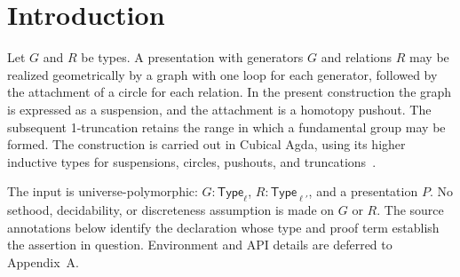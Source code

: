 \section{Introduction}

Let $G$ and $R$ be types.  A presentation with generators $G$ and relations
$R$ may be realized geometrically by a graph with one loop for each generator,
followed by the attachment of a circle for each relation.  In the present
construction the graph is expressed as a suspension, and the attachment is a
homotopy pushout.  The subsequent 1-truncation retains the range in which a
fundamental group may be formed.  The construction is carried out in Cubical
Agda, using its higher inductive types for suspensions, circles, pushouts, and
truncations~\cite{cubical,hottbook}.

The input is universe-polymorphic: $G:\mathsf{Type}_{\ell}$,
$R:\mathsf{Type}_{\ell'}$, and a presentation $P$.  No sethood,
decidability, or discreteness assumption is made on $G$ or $R$.  The source
annotations below identify the declaration whose type and proof term establish
the assertion in question.  Environment and API details are deferred to
Appendix~A.
